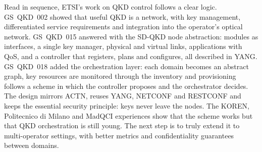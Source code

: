 Read in sequence, ETSI's work on QKD control follows a clear logic.
GS~QKD~002 showed that useful QKD is a network, with key management,
differentiated service requirements and integration into the operator's
optical network. GS~QKD~015 answered with the SD-QKD node abstraction:
modules as interfaces, a single key manager, physical and virtual links,
applications with QoS, and a controller that registers, plans and
configures, all described in YANG. GS~QKD~018 added the orchestration
layer: each domain becomes an abstract graph, key resources are monitored
through the inventory and provisioning follows a scheme in which the
controller proposes and the orchestrator decides. The design mirrors ACTN,
reuses YANG, NETCONF and RESTCONF and keeps the essential security
principle: keys never leave the nodes. The KOREN, Politecnico di Milano and
MadQCI experiences show that the scheme works but that QKD orchestration is
still young. The next step is to truly extend it to multi-operator
settings, with better metrics and confidentiality guarantees between
domains.
